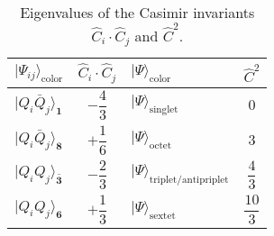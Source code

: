 \documentclass[twocolumn,showpacs,superscriptaddress,preprintnumbers,nofootinbib,prd]{revtex4-1}
\begin{document}
\begin{table}
  \renewcommand\arraystretch{2.2}
  \centering
\begin{tabular}{p{3cm} c | p{3.5cm} c}
  \hline\hline
  $\big|\Psi_{ij} \big\rangle_{\textrm{color}}$ & $\hat{C}_i \cdot \hat{C}_j$ &
$\big|\Psi\big\rangle_{\textrm{color}}$ & $\hat{C}^2$\\ \hline
  $\big|Q_i \bar{Q}_j \big\rangle_\mathbf{1}$ &  $-\dfrac{4}{3}$ &
$\big|\Psi\big\rangle_{\textrm{singlet}}$ & $0$ \\
  $\big|Q_i \bar{Q}_j \big\rangle_\mathbf{8}$ &  $+\dfrac{1}{6}$ &
$\big|\Psi\big\rangle_{\textrm{octet}}$ & $3$ \\
  $\big|Q_i Q_j \big\rangle_\mathbf{\bar{3}}$ & $-\dfrac{2}{3}$ &
$\big|\Psi\big\rangle_{\textrm{triplet/antipriplet}}$ & $\dfrac{4}{3}$ \\
  $\big|Q_i Q_j \big\rangle_\mathbf{6}$ & $+\dfrac{1}{3}$  &
$\big|\Psi\big\rangle_{\textrm{sextet}}$ & $\dfrac{10}{3}$ \\
  \hline\hline
\end{tabular}
\caption{Eigenvalues of the Casimir invariants $ \hat{C}_i \cdot
\hat{C}_j$ and $\hat{C}^2$.
}
\label{casimir}
\end{table}
\end{document}
